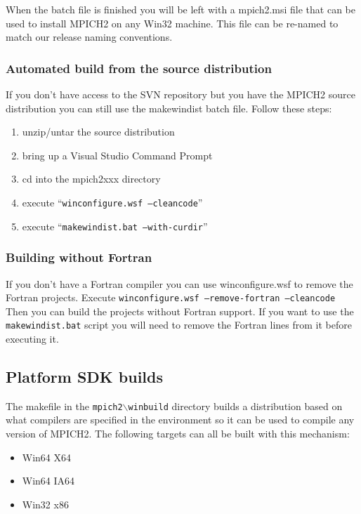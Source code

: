 \documentclass[dvipdfm,11pt]{article}
\begin{document}
When the batch file is finished you will be left with a mpich2.msi file that can be used to
install MPICH2 on any Win32 machine.  This file can be re-named to match our release naming 
conventions.

\subsubsection{Automated build from the source distribution}
If you don't have access to the SVN repository but you have the MPICH2 source
distribution you can still use the makewindist batch file.  Follow these steps:
\begin{enumerate}
\item unzip/untar the source distribution
\item bring up a Visual Studio Command Prompt
\item cd into the mpich2xxx directory
\item execute ``\texttt{winconfigure.wsf --cleancode}''
\item execute ``\texttt{makewindist.bat --with-curdir}''
\end{enumerate}

\subsubsection{Building without Fortran}
If you don't have a Fortran compiler you can use winconfigure.wsf to remove the
Fortran projects.  Execute \texttt{winconfigure.wsf --remove-fortran --cleancode}
Then you can build the projects without Fortran support.  If you want to use the
\texttt{makewindist.bat} script you will need to remove the Fortran lines from
it before executing it.

\subsection{Platform SDK builds}
\label{sec:psdk_build}

The makefile in the \texttt{mpich2$\backslash$winbuild} directory builds a distribution based 
on what compilers are specified in the environment so it can be used to compile any version of
MPICH2.  The following targets can all be built with this mechanism:
\begin{itemize}
\item Win64 X64
\item Win64 IA64
\item Win32 x86
\end{itemize}
\end{document}
